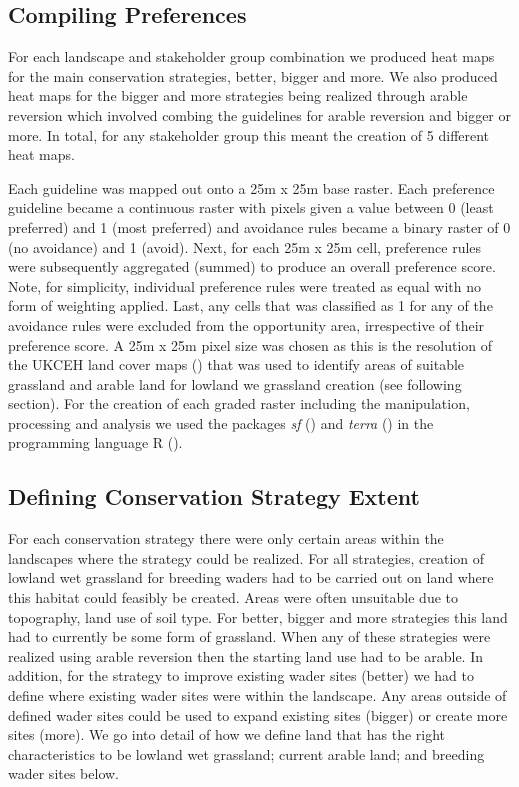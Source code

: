 \documentclass[
  12pt,
  letterpaper,
  DIV=11,
  numbers=noendperiod]{scrartcl}
\begin{document}
\subsection{Compiling Preferences}\label{compiling-preferences}

For each landscape and stakeholder group combination we produced heat
maps for the main conservation strategies, better, bigger and more. We
also produced heat maps for the bigger and more strategies being
realized through arable reversion which involved combing the guidelines
for arable reversion and bigger or more. In total, for any stakeholder
group this meant the creation of 5 different heat maps.

Each guideline was mapped out onto a 25m x 25m base raster. Each
preference guideline became a continuous raster with pixels given a
value between 0 (least preferred) and 1 (most preferred) and avoidance
rules became a binary raster of 0 (no avoidance) and 1 (avoid). Next,
for each 25m x 25m cell, preference rules were subsequently aggregated
(summed) to produce an overall preference score. Note, for simplicity,
individual preference rules were treated as equal with no form of
weighting applied. Last, any cells that was classified as 1 for any of
the avoidance rules were excluded from the opportunity area,
irrespective of their preference score. A 25m x 25m pixel size was
chosen as this is the resolution of the UKCEH land cover maps
() that was used to
identify areas of suitable grassland and arable land for lowland we
grassland creation (see following section). For the creation of each
graded raster including the manipulation, processing and analysis we
used the packages \emph{sf} ()
and \emph{terra} () in the
programming language R ().

\subsection{Defining Conservation Strategy
Extent}\label{defining-conservation-strategy-extent}

For each conservation strategy there were only certain areas within the
landscapes where the strategy could be realized. For all strategies,
creation of lowland wet grassland for breeding waders had to be carried
out on land where this habitat could feasibly be created. Areas were
often unsuitable due to topography, land use of soil type. For better,
bigger and more strategies this land had to currently be some form of
grassland. When any of these strategies were realized using arable
reversion then the starting land use had to be arable. In addition, for
the strategy to improve existing wader sites (better) we had to define
where existing wader sites were within the landscape. Any areas outside
of defined wader sites could be used to expand existing sites (bigger)
or create more sites (more). We go into detail of how we define land
that has the right characteristics to be lowland wet grassland; current
arable land; and breeding wader sites below.
\end{document}
